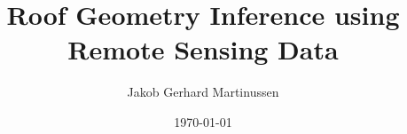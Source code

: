 \documentclass[american,titlepage]{ntnuthesis}
\title{Roof Geometry Inference using Remote Sensing Data}
\author{Jakob Gerhard Martinussen}
\date{\today}
\begin{document}



\tableofcontents
\listoffigures
\listoftables
\lstlistoflistings






\printbibliography

\appendix

\end{document}
